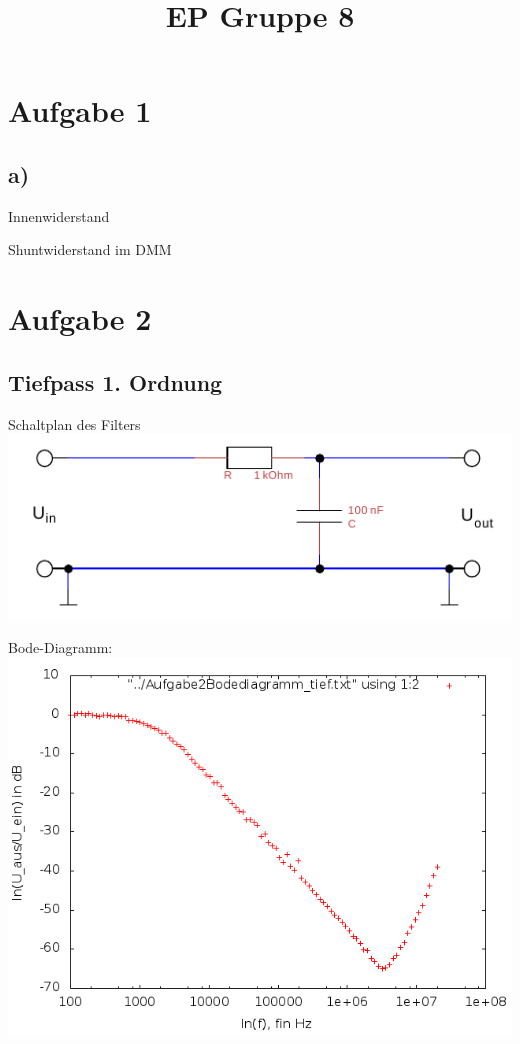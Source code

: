 \documentclass[compress,11pt]{beamer}
\title{EP Gruppe 8}
\begin{document}
\frame[c]{\titlepage}
\begin{frame}
\tableofcontents
\end{frame}

\section{Aufgabe 1}
\subsection{a)}
\begin{frame}{Innenwiderstand}
\begin{block}{Shuntwiderstand im DMM}
\end{block}
\end{frame}
\section{Aufgabe 2}
\subsection{Tiefpass 1. Ordnung}
\begin{frame}
\begin{block}{Schaltplan des Filters}
\includegraphics[width=\textwidth]{../daten/Messdaten/plots/schalt_tief}
\end{block}
\end{frame}
Bode-Diagramm:
\includegraphics[width=\textwidth]{../daten/Messdaten/plots/Aufgabe2Bodediagramm_tief_gain}
\end{document}
